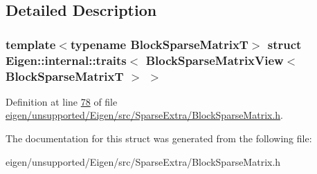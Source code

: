 \subsection{Detailed Description}
\subsubsection*{template$<$typename Block\+Sparse\+MatrixT$>$\newline
struct Eigen\+::internal\+::traits$<$ Block\+Sparse\+Matrix\+View$<$ Block\+Sparse\+Matrix\+T $>$ $>$}



Definition at line \hyperlink{eigen_2unsupported_2_eigen_2src_2_sparse_extra_2_block_sparse_matrix_8h_source_l00078}{78} of file \hyperlink{eigen_2unsupported_2_eigen_2src_2_sparse_extra_2_block_sparse_matrix_8h_source}{eigen/unsupported/\+Eigen/src/\+Sparse\+Extra/\+Block\+Sparse\+Matrix.\+h}.



The documentation for this struct was generated from the following file\+:\begin{DoxyCompactItemize}
\item 
eigen/unsupported/\+Eigen/src/\+Sparse\+Extra/\+Block\+Sparse\+Matrix.\+h\end{DoxyCompactItemize}
